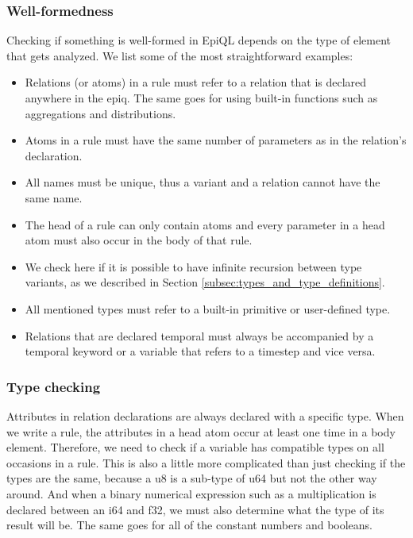 \subsubsection{Well-formedness}
Checking if something is well-formed in EpiQL depends on the type of element that gets analyzed. We list some of the most straightforward examples:
\begin{itemize}
    \item Relations (or atoms) in a rule must refer to a relation that is declared anywhere in the epiq. The same goes for using built-in functions such as aggregations and distributions.
    \item Atoms in a rule must have the same number of parameters as in the relation's declaration.
    \item All names must be unique, thus a variant and a relation cannot have the same name.
    \item The head of a rule can only contain atoms and every parameter in a head atom must also occur in the body of that rule.
    \item We check here if it is possible to have infinite recursion between type variants, as we described in Section \ref{subsec:types_and_type_definitions}.
    \item All mentioned types must refer to a built-in primitive or user-defined type.
    \item Relations that are declared temporal must always be accompanied by a temporal keyword or a variable that refers to a timestep and vice versa.
\end{itemize}

\subsubsection{Type checking}
Attributes in relation declarations are always declared with a specific type. When we write a rule, the attributes in a head atom occur at least one time in a body element. Therefore, we need to check if a variable has compatible types on all occasions in a rule. This is also a little more complicated than just checking if the types are the same, because a u8 is a sub-type of u64 but not the other way around. And when a binary numerical expression such as a multiplication is declared between an i64 and f32, we must also determine what the type of its result will be. The same goes for all of the constant numbers and booleans.

